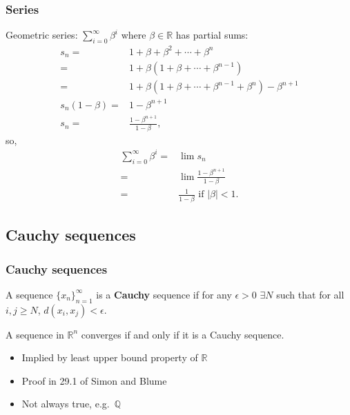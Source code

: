 \documentclass[compress]{beamer}
\def\R{\mathbb{R}}
\newcommand{\seq}[1]{\{{#1}_n \}_{n=1}^\infty }
\begin{document}
\begin{frame}[shrink]\frametitle{Series}
  \begin{example}
    Geometric series: $\sum_{i=0}^\infty \beta^i$ where $\beta \in \R$
    has partial sums:    
    \begin{align*}
      s_n = & 1 + \beta + \beta^2 + \cdots + \beta^n \\
      = & 1 + \beta ( 1 + \beta + \cdots + \beta^{n-1} ) \\
      = & 1 + \beta ( 1 + \beta + \cdots + \beta^{n-1} + \beta^n) -
      \beta^{n+1} \\
      s_n(1 - \beta) = & 1 - \beta^{n+1} \\
      s_n = & \frac{1 - \beta^{n+1}}{1-\beta} ,
    \end{align*}
    so, 
    \begin{align*}
      \sum_{i=0}^\infty \beta^i = & \lim s_n \\
      = & \lim \frac{1 - \beta^{n+1}}{1-\beta} \\
      = & \frac{1}{1-\beta} \text{ if } |\beta|<1.
    \end{align*}
  \end{example}  
\end{frame}

\subsection*{Cauchy sequences}

\begin{frame}
  \frametitle{Cauchy sequences}
  \begin{definition}
    A sequence $\seq{x}$ is a \textbf{Cauchy} sequence if for any
    $\epsilon > 0$ $\exists N$ such that for all $i,j\geq N$,
    $d(x_i,x_j) < \epsilon$.
  \end{definition}
  \begin{theorem}
    A sequence in $\R^n$ converges if and only if it is a Cauchy
    sequence. 
  \end{theorem}
  \begin{itemize}
  \item Implied by least upper bound property of $\R$
  \item Proof in 29.1 of Simon and Blume
  \item Not always true, e.g.\ $\mathbb{Q}$
  \end{itemize}
\end{frame}
\end{document}
